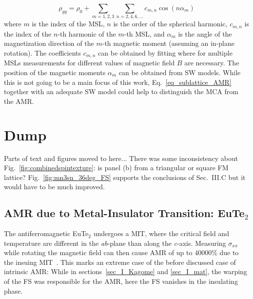 \documentclass[prb,showpacs,amsmath,amssymb,superscriptaddress,twocolumn,floatfix]{revtex4-1}
\begin{document}
\begin{appendix}
\begin{equation}
	\rho_{yy} = \rho_0 + \sum_{m = 1,2,3} \sum_{n = 2, 4, 6, ...} c_{m,n} \cos(n \alpha_m)
	\label{eq_sublattice_AMR}
\end{equation}
where $m$ is the index of the MSL, $n$ is the order of the spherical harmonic, $c_{m,n}$ is the index of the $n$-th harmonic of the $m$-th MSL, and $\alpha_m$ is the angle of the magnetization direction of the $m$-th magnetic moment (assuming an in-plane rotation). The coefficients $c_{m,n}$ can be obtained by fitting where for multiple MSLs measurements for different values of magnetic field $B$ are necessary. The position of the magnetic moments $\alpha_m$ can be obtained from SW models. While this is not going to be a main focus of this work, Eq.~\ref{eq_sublattice_AMR} together with an adequate SW model could help to distinguish the MCA from the AMR.


\section{Dump}

Parts of text and figures moved to here... There was some
inconsistency about Fig.~\ref{fig:combinedspintexture}: is panel (b) from
a triangular or square FM lattice? Fig.~\ref{fig:mn3sn_36deg_FS} supports
the conclusions of Sec.~III.C but it would have to be much improved.

\subsection{AMR due to Metal-Insulator Transition: EuTe$_2$}
\label{sec_I_EuTe2}

The antiferromagnetic EuTe$_2$ undergoes a MIT, where the critical field and temperature are different in the \textit{ab}-plane than along the \textit{c}-axis. Measuring $\sigma_{xx}$ while rotating the magnetic field can then cause AMR of up to $40000\%$ due to the insuing MIT~\cite{Yang:2021}. This marks an extreme case of the before discussed case of intrinsic AMR: While in sections~\ref{sec_I_Kagome} and \ref{sec_I_mat}, the warping of the FS was responsible for the AMR, here the FS vanishes in the insulating phase.



\end{appendix}
\end{document}

